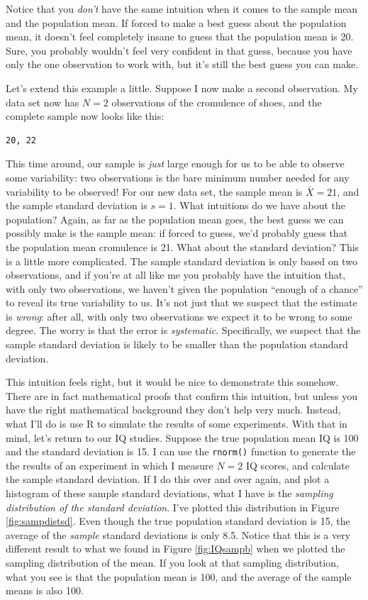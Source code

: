 \documentclass[spanish,]{book}
\begin{document}
Notice that you \emph{don't} have the same intuition when it comes to
the sample mean and the population mean. If forced to make a best guess
about the population mean, it doesn't feel completely insane to guess
that the population mean is 20. Sure, you probably wouldn't feel very
confident in that guess, because you have only the one observation to
work with, but it's still the best guess you can make.

Let's extend this example a little. Suppose I now make a second
observation. My data set now has \(N=2\) observations of the cromulence
of shoes, and the complete sample now looks like this:

\begin{verbatim}
20, 22
\end{verbatim}

This time around, our sample is \emph{just} large enough for us to be
able to observe some variability: two observations is the bare minimum
number needed for any variability to be observed! For our new data set,
the sample mean is \(\bar{X}=21\), and the sample standard deviation is
\(s=1\). What intuitions do we have about the population? Again, as far
as the population mean goes, the best guess we can possibly make is the
sample mean: if forced to guess, we'd probably guess that the population
mean cromulence is 21. What about the standard deviation? This is a
little more complicated. The sample standard deviation is only based on
two observations, and if you're at all like me you probably have the
intuition that, with only two observations, we haven't given the
population ``enough of a chance'' to reveal its true variability to us.
It's not just that we suspect that the estimate is \emph{wrong}: after
all, with only two observations we expect it to be wrong to some degree.
The worry is that the error is \emph{systematic}. Specifically, we
suspect that the sample standard deviation is likely to be smaller than
the population standard deviation.

This intuition feels right, but it would be nice to demonstrate this
somehow. There are in fact mathematical proofs that confirm this
intuition, but unless you have the right mathematical background they
don't help very much. Instead, what I'll do is use R to simulate the
results of some experiments. With that in mind, let's return to our IQ
studies. Suppose the true population mean IQ is 100 and the standard
deviation is 15. I can use the \texttt{rnorm()} function to generate the
the results of an experiment in which I measure \(N=2\) IQ scores, and
calculate the sample standard deviation. If I do this over and over
again, and plot a histogram of these sample standard deviations, what I
have is the \emph{sampling distribution of the standard deviation}. I've
plotted this distribution in Figure \ref{fig:sampdistsd}. Even though
the true population standard deviation is 15, the average of the
\emph{sample} standard deviations is only 8.5. Notice that this is a
very different result to what we found in Figure \ref{fig:IQsampb} when
we plotted the sampling distribution of the mean. If you look at that
sampling distribution, what you see is that the population mean is 100,
and the average of the sample means is also 100.
\end{document}
